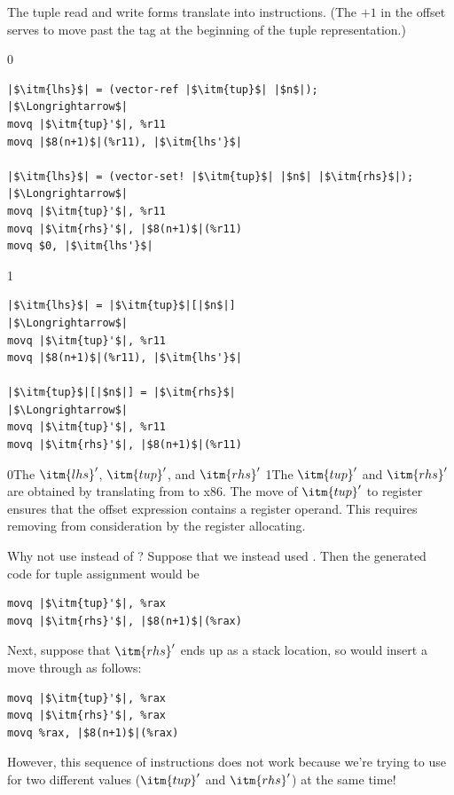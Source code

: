 \documentclass[7x10]{TimesAPriori_MIT}%
\def\racketEd{0}
\def\pythonEd{1}
\def\edition{1}
\newcommand{\racket}[1]{{\if\edition\racketEd{#1}\fi}}
\newcommand{\pythonColor}[0]{}
\newcommand{\python}[1]{{\if\edition\pythonEd\pythonColor #1\fi}}
\numberwithin{theorem}{chapter}
\numberwithin{definition}{chapter}
\numberwithin{equation}{chapter}
\begin{document}
The tuple read and write forms translate into 
instructions.  (The $+1$ in the offset serves to move past the tag at the
beginning of the tuple representation.)
%
\begin{center}
\begin{minipage}{\textwidth}
{\if\edition\racketEd    
\begin{lstlisting}
|$\itm{lhs}$| = (vector-ref |$\itm{tup}$| |$n$|);
|$\Longrightarrow$|
movq |$\itm{tup}'$|, %r11
movq |$8(n+1)$|(%r11), |$\itm{lhs'}$|

|$\itm{lhs}$| = (vector-set! |$\itm{tup}$| |$n$| |$\itm{rhs}$|);
|$\Longrightarrow$|
movq |$\itm{tup}'$|, %r11
movq |$\itm{rhs}'$|, |$8(n+1)$|(%r11)
movq $0, |$\itm{lhs'}$|
\end{lstlisting}
\fi}
{\if\edition\pythonEd\pythonColor    
\begin{lstlisting}
|$\itm{lhs}$| = |$\itm{tup}$|[|$n$|]
|$\Longrightarrow$|
movq |$\itm{tup}'$|, %r11
movq |$8(n+1)$|(%r11), |$\itm{lhs'}$|

|$\itm{tup}$|[|$n$|] = |$\itm{rhs}$|
|$\Longrightarrow$|
movq |$\itm{tup}'$|, %r11
movq |$\itm{rhs}'$|, |$8(n+1)$|(%r11)
\end{lstlisting}
\fi}
\end{minipage}
\end{center}
\racket{The $\itm{lhs}'$, $\itm{tup}'$, and $\itm{rhs}'$}
\python{The $\itm{tup}'$ and $\itm{rhs}'$}
are obtained by translating from \LangCVec{} to x86.
%
The move of $\itm{tup}'$ to
register  ensures that the offset expression
 contains a register operand.  This requires
removing  from consideration by the register allocating.

Why not use  instead of ? Suppose that we instead used
. Then the generated code for tuple assignment would be
\begin{lstlisting}
movq |$\itm{tup}'$|, %rax
movq |$\itm{rhs}'$|, |$8(n+1)$|(%rax)
\end{lstlisting}
Next, suppose that $\itm{rhs}'$ ends up as a stack location, so
 would insert a move through 
as follows:
\begin{lstlisting}
movq |$\itm{tup}'$|, %rax
movq |$\itm{rhs}'$|, %rax
movq %rax, |$8(n+1)$|(%rax)
\end{lstlisting}
However, this sequence of instructions does not work because we're
trying to use  for two different values ($\itm{tup}'$ and
$\itm{rhs}'$) at the same time!
\end{document}

